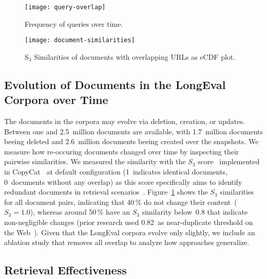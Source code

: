 \begin{figure}[t]
    \begin{minipage}{.49\textwidth}
        \texttt{[image: query-overlap]}
        \vspace{-4ex}
        \caption{Frequency of queries over time.}
        \label{fig:query-overlap}
    \end{minipage}
    \hfill    
    \begin{minipage}{.49\textwidth}
        \texttt{[image: document-similarities]}
        \vspace{-4ex}
        \caption{S$_{3}$ Similarities of documents with overlapping URLs as eCDF plot.}
        \label{fig:document-similarities}
    \end{minipage}
\end{figure}

\subsection{Evolution of Documents in the LongEval Corpora over Time}

The documents in the corpora may evolve via deletion, creation, or updates. Between one and 2.5~million documents are available, with 1.7~million documents beeing deleted and 2.6~million documents beeing created over the snapshots. We measure how re-occuring documents changed over time by inspecting their pairwise similarities. We measured the similarity with the $S_{3}$ score~\cite{bernstein:2005} implemented in CopyCat~\cite{froebe:2021a} at default configuration (1~indicates identical documents, 0~documents without any overlap) as this score specifically aims to identify redundant documents in retrieval scenarios~\cite{bernstein:2005}. Figure~\ref{fig:document-similarities} shows the $S_{3}$ similarities for all document pairs, indicating that 40\,\% do not change their content~($S_{3}=1.0$), whereas around 50\,\% have an $S_{3}$ similarity below~0.8 that indicate non-negligible changes (prior research used 0.82~as near-duplicate threshold on the Web~\cite{froebe:2021a}). Given that the LongEval corpora evolve only slightly, we include an ablation study that removes all overlap to analyze how approaches generalize.



\enlargethispage*{2\baselineskip}
\subsection{Retrieval Effectiveness}


